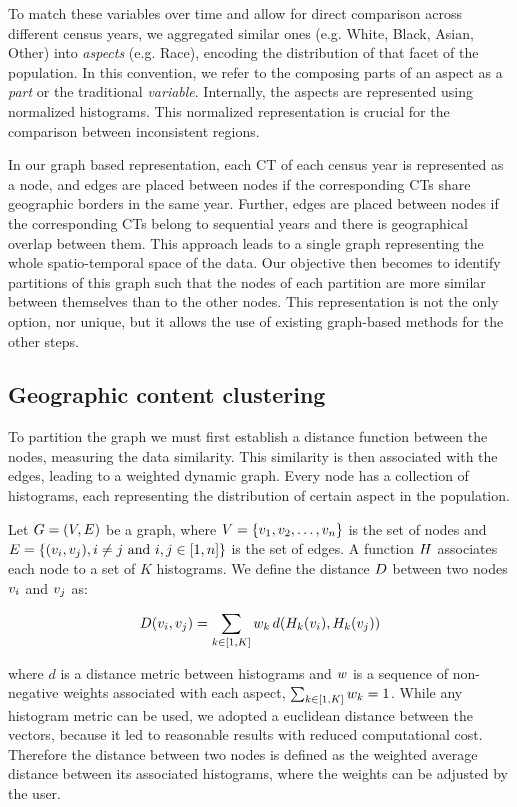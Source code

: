 To match these variables over time and allow for direct comparison across
different census years, we aggregated similar ones (e.g. White, Black, Asian,
Other) into \emph{aspects} (e.g. Race), encoding the distribution of that facet
of the population. In this convention, we refer to the composing parts of an
aspect as a \emph{part} or the traditional \emph{variable}. Internally, the
aspects are represented using normalized histograms. This normalized
representation is crucial for the comparison between inconsistent regions.


In our graph based representation, each CT of each census year is represented as
a node, and edges are placed between nodes if the corresponding CTs share
geographic borders in the same year. Further, edges are placed between nodes if
the corresponding CTs belong to sequential years and there is geographical
overlap between them. This approach leads to a single graph representing the
whole spatio-temporal space of the data. Our objective then becomes to identify
partitions of this graph such that the nodes of each partition are more similar
between themselves than to the other nodes. This representation is not the only
option, nor unique, but it allows the use of existing graph-based methods for
the other steps.

\subsection{Geographic content clustering}
To partition the graph we must first establish a distance function between the
nodes, measuring the data similarity. This similarity is then associated with
the edges, leading to a weighted dynamic graph. Every node has a collection of
histograms, each representing the distribution of certain aspect in the
population.

Let $G=(V,E)$ be a graph, where
$V=\{v_1,v_2,\dots,v_n\}$ is the set of nodes and
$E=\{(v_i,v_j), i\not=j\text{ and }i,j \in [1,n]\}$ is the set of
edges. A function $H$ associates each node to a set of $K$ histograms. We
define the distance $D$ between two nodes $v_i$ and $v_j$ as:

\begin{equation}
    \D(\vertice_i,\vertice_j)=\sum_{k \in [1,K]}{\weight_k\, d(\Hist_k(\vertice_i),\Hist_k(\vertice_j))}
    \label{eq:dist}
\end{equation}

\noindent where $d$ is a distance metric between histograms and $w$ is a
sequence of non-negative weights associated with each aspect,
$\sum_{k\in[1,K]}{w_k}=1$. While any histogram metric can be used, we
adopted a euclidean distance between the vectors, because it led to reasonable
results with reduced computational cost. Therefore the distance between two
nodes is defined as the weighted average distance between its associated
histograms, where the weights can be adjusted by the user.

